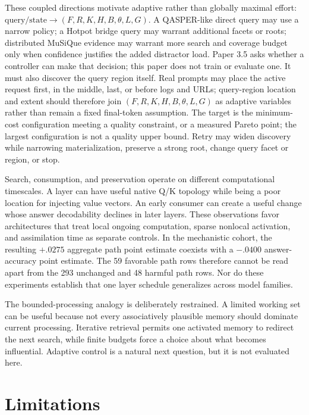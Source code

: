 These coupled directions motivate adaptive rather than globally maximal effort:
$\mathrm{query/state}\rightarrow(F,R,K,H,B,\theta,L,G)$.  A QASPER-like direct query may use a
narrow policy; a Hotpot bridge query may warrant additional facets or roots; distributed MuSiQue
evidence may warrant more search and coverage budget only when confidence justifies the added
distractor load.  Paper 3.5 asks whether a controller can make that decision; this paper does not
train or evaluate one.  It must also discover the query region itself.  Real prompts may place the
active request first, in the middle, last, or before logs and URLs; query-region location and extent
should therefore join $(F,R,K,H,B,\theta,L,G)$ as adaptive variables rather than remain a fixed
final-token assumption.
The target is the minimum-cost configuration meeting a quality constraint, or a measured Pareto point;
the largest configuration is not a quality upper bound.  Retry may widen discovery while narrowing
materialization, preserve a strong root, change query facet or region, or stop.

Search, consumption, and preservation operate on different computational timescales.  A layer can
have useful native Q/K topology while being a poor location for injecting value vectors.  An early
consumer can create a useful change whose answer decodability declines in later layers.  These observations favor architectures
that treat local ongoing computation, sparse nonlocal activation, and assimilation time as separate
controls.  In the mechanistic cohort, the resulting $+.0275$ aggregate path point estimate coexists
with a $-.0400$ answer-accuracy point estimate.  The 59 favorable path rows therefore cannot be read
apart from the 293 unchanged and 48 harmful path rows.  Nor do these experiments establish that one
layer schedule generalizes across model families.

The bounded-processing analogy is deliberately restrained.  A limited working set can be useful
because not every associatively plausible memory should dominate current processing.  Iterative
retrieval permits one activated memory to redirect the next search, while finite budgets force a
choice about what becomes influential.  Adaptive control is a natural next question, but it is not
evaluated here.

\section{Limitations}


